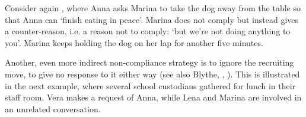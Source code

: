 \documentclass[output=paper,modfonts,nonflat]{langsci/langscibook}
\begin{document}
Consider again , where Anna asks Marina to take the dog away from the table so that Anna can ‘finish eating in peace’. Marina does not comply but instead gives a counter-reason, i.e. a reason not to comply: ‘but we're not doing anything to you’. Marina keeps holding the dog on her lap for another five minutes. 

Another, even more indirect non-compliance strategy is to ignore the recruiting move, to give no response to it either way (see also Blythe, , ). This is illustrated in the next example, where several school custodians gathered for lunch in their staff room. Vera makes a request of Anna, while Lena and Marina are involved in an unrelated conversation.

\end{document}
